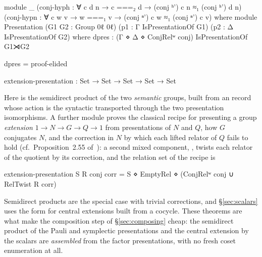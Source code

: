 \begingroup\renewcommand{\AgdaCodeStyle}{\footnotesize}
\begin{code}
module _ (conj-hyph : ∀ {c d} n → c ===₂ d → (conj ʰ') c n ≈₁ (conj ʰ') d n)
         (conj-hypn : ∀ c {w v} → w ===₁ v → (conj ⁿ') c w ≈₁ (conj ⁿ') c v) where
  module Presentation (G1 G2 : Group 0ℓ 0ℓ)
    (p1 : Γ IsPresentationOf G1) (p2 : Δ IsPresentationOf G2) where
    dpres : (Γ ⋄ Δ ⋄ ConjRelʷ conj) IsPresentationOf G1⋊G2
\end{code}
\endgroup
\begin{code}[hide]
    dpres = proof-elided

extension-presentation : Set → Set → Set → Set → Set
\end{code}

\noindent Here  is the semidirect product of the two
\emph{semantic} groups, built from an  record whose action
is the syntactic  transported through the two presentation
isomorphisms.  A further module proves the classical recipe for
presenting a group \emph{extension} $1 \to N \to G \to Q \to 1$ from
presentations of $N$ and $Q$, how $G$ conjugates $N$, and the
correction in $N$ by which each lifted relator of $Q$ fails to hold
(cf.\ Proposition~2.55 of~\cite{holt2005handbook}): a second mixed
component, , twists each relator of the quotient by its
correction, and the relation set of the recipe is
\begingroup\renewcommand{\AgdaCodeStyle}{\footnotesize}
\begin{code}
extension-presentation S R conj corr = S ⋄ EmptyRel ⋄ (ConjRelʷ conj ∪ RelTwist R corr)
\end{code}
\endgroup
Semidirect products are the special case with trivial corrections, and
\S\ref{sec:scalars} uses the form for central extensions built from a
cocycle.  These theorems are what make the composition step of
\S\ref{sec:composing} cheap: the semidirect product of the Pauli and
symplectic presentations and the central extension by the scalars are
\emph{assembled} from the factor presentations, with no fresh coset
enumeration at all.
